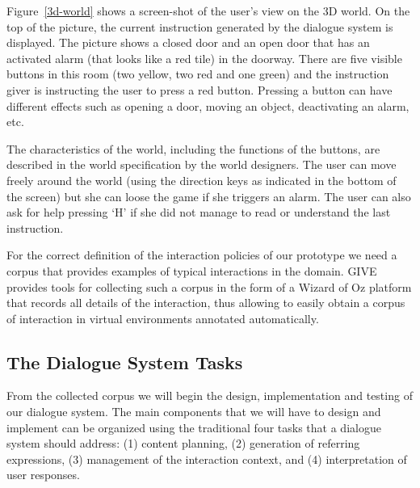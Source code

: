 Figure~\ref{3d-world} shows a screen-shot of the user's view on
the 3D world. On the top of the picture, the current instruction generated 
by the dialogue system is displayed. The picture shows a closed
door and an open door that has an activated alarm (that looks like a
red tile) in the doorway. There are five visible buttons in this room
(two yellow, two red and one green) and the instruction giver is
instructing the user to press a red button. Pressing a button can have
different effects such as opening a door, moving an object, deactivating an alarm, etc.

The characteristics of the world, including the functions of the
buttons, are described in the world specification by the world
designers. The user can move freely around the world (using the direction keys
as indicated in the bottom of the screen) but she can loose the game if she
triggers an alarm. The user can also ask for help pressing `H' if she did not
manage to read or understand the last instruction.

For the correct definition of the interaction policies of our prototype we need
a corpus that provides examples of typical interactions in the domain. GIVE
provides tools for collecting such a corpus in the form of a Wizard of Oz
platform that records all details of the interaction, thus
allowing to easily obtain a corpus of interaction in virtual environments
annotated automatically.

\subsection{The Dialogue System Tasks}

From the collected corpus we will begin the design, implementation and testing
of our dialogue system.  The main components that we will have to design and 
implement can be organized using the traditional four tasks that a dialogue 
system should address: (1) content planning, (2)
generation of referring expressions, (3) management of the interaction context, and
(4) interpretation of user responses. 

